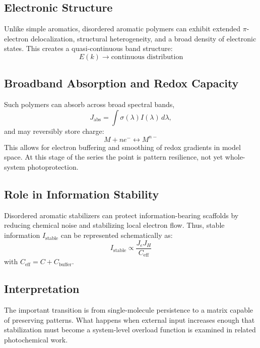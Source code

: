 \documentclass[11pt,a4paper]{article}
\begin{document}
\subsection{Electronic Structure}
Unlike simple aromatics, disordered aromatic polymers can exhibit extended $\pi$-electron delocalization, structural heterogeneity, and a broad density of electronic states. This creates a quasi-continuous band structure:
\begin{equation}
E(k) \rightarrow \text{continuous distribution}
\end{equation}

\subsection{Broadband Absorption and Redox Capacity}
Such polymers can absorb across broad spectral bands,
\begin{equation}
J_{\mathrm{abs}} = \int \sigma(\lambda) I(\lambda)\,d\lambda,
\end{equation}
and may reversibly store charge:
\begin{equation}
M + ne^- \leftrightarrow M^{n-}
\end{equation}
This allows for electron buffering and smoothing of redox gradients in model space. At this stage of the series the point is pattern resilience, not yet whole-system photoprotection.

\subsection{Role in Information Stability}
Disordered aromatic stabilizers can protect information-bearing scaffolds by reducing chemical noise and stabilizing local electron flow. Thus, stable information $I_{\mathrm{stable}}$ can be represented schematically as:
\begin{equation}
I_{\mathrm{stable}} \propto \frac{J_e J_H}{C_{\mathrm{eff}}}
\end{equation}
with $C_{\mathrm{eff}} = C + C_{\mathrm{buffer}}$.

\subsection{Interpretation}
The important transition is from single-molecule persistence to a matrix capable of preserving patterns. What happens when external input increases enough that stabilization must become a system-level overload function is examined in related photochemical work.
\end{document}
